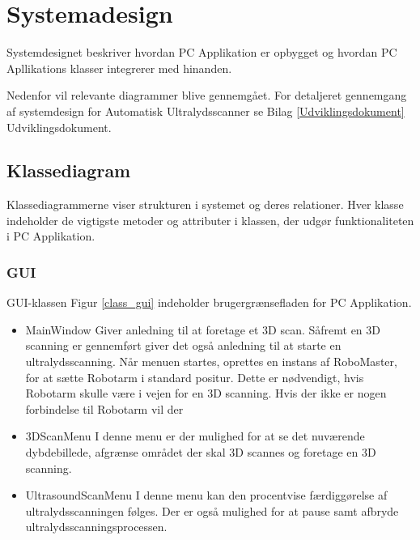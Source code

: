 \chapter{Systemadesign}\label{Systemdesign}
Systemdesignet beskriver hvordan PC Applikation er opbygget og hvordan PC Apllikations klasser integrerer med hinanden.  

Nedenfor vil relevante diagrammer blive gennemgået. For detaljeret gennemgang af systemdesign for Automatisk Ultralydsscanner se Bilag  \ref{Udviklingsdokument} Udviklingsdokument.

\section{Klassediagram}
Klassediagrammerne viser strukturen
i systemet og deres relationer. Hver klasse indeholder de vigtigste metoder og attributer
i klassen, der udgør funktionaliteten i PC Applikation. 

\subsection{GUI}
GUI-klassen Figur \ref{class_gui} indeholder brugergrænsefladen for PC Applikation.

\let\labelitemi\labelitemii
\begin{itemize}
\item{MainWindow}\newline
Giver anledning til at foretage et 3D scan. Såfremt en 3D scanning er gennemført giver det også anledning til at starte en ultralydsscanning.
Når menuen startes, oprettes en instans af RoboMaster, for at sætte Robotarm i standard positur. Dette er nødvendigt, hvis Robotarm skulle være i vejen for en 3D scanning.
Hvis der ikke er nogen forbindelse til Robotarm vil der 

\item{3DScanMenu}\newline
I denne menu er der mulighed for at se det nuværende dybdebillede, afgrænse området der skal 3D scannes og foretage en 3D scanning.

\item{UltrasoundScanMenu}\newline
I denne menu kan den procentvise færdiggørelse af ultralydsscanningen følges. Der er også mulighed for at pause samt afbryde ultralydsscanningsprocessen.
\end{itemize}

